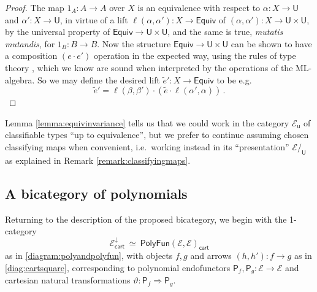 \documentclass[12pt,reqno]{amsart}
\newcommand{\EE}{\ensuremath{\mathcal{E}}}
\newcommand{\alg}[1]{\ensuremath{\mathsf{#1}}}
\renewcommand{\to}{\ensuremath{\rightarrow}}
\renewcommand{\t}{\ensuremath{\mathsf{u}}}
\newcommand{\T}{\ensuremath{\mathsf{U}}}
\theoremstyle{remark}
\theoremstyle{definition}
\begin{document}
\begin{proof}
The map $1_A : A \to A$ over $X$ is an equivalence with respect to $\alpha: X \to \T$ and $\alpha': X \to \T$, in virtue of a lift $\ell(\alpha, \alpha') : X \to\mathsf{Equiv}$ of $(\alpha, \alpha') : X \to \T\times \T$, by the universal property of $\mathsf{Equiv} \to \T\times \T$, and the same is true, \emph{mutatis mutandis}, for  $1_B : B \to B$.  Now the structure $\mathsf{Equiv} \to \T\times \T$ can be shown to have a composition $(e\cdot e')$ operation in the expected way, using the rules of type theory \cite[Theorem 4.7.1]{HoTTbook}, which we know are sound when interpreted by the operations of the ML-algebra.  So we may define the desired lift ${\tilde{e}}' : X \to \mathsf{Equiv}$ to be e.g. $${\tilde{e}}' = \ell(\beta, \beta') \cdot ({\tilde{e}}\cdot\ell(\alpha', \alpha))\,.$$
\end{proof}
%
Lemma \ref{lemma:equivinvariance} tells us that we could work in the category $\EE_\t$ of classifiable types ``up to equivalence'', but we prefer to continue assuming chosen classifying maps when convenient, i.e.\ working instead in its ``presentation'' $\EE/_\T$ as explained in Remark \ref{remark:classifyingmaps}.

\subsection{A bicategory of polynomials}\label{sec:2cells}

Returning to the description of the proposed bicategory, we begin with the 1-category
\[
\EE^{\downarrow}_{\mathsf{cart}}\ \simeq\ \mathsf{PolyFun}(\EE, \EE)_{\mathsf{cart}}
\]
as in \eqref{diagram:polyandpolyfun}, with objects $f, g$ and arrows $(h, h') : f \to g$ as in \eqref{diag:cartsquare}, corresponding to polynomial endofunctors $\alg{P}_f, \alg{P}_g : \EE \to \EE$ and cartesian natural transformations $\vartheta : \alg{P}_f \Rightarrow \alg{P}_g$.
\end{document}
